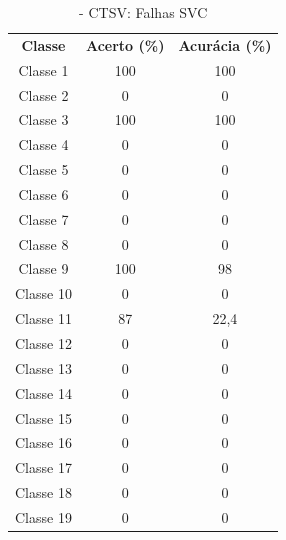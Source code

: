 \begin{itemize}
 \begin{table}[ht]
\centering
\begin{tabular}{ccc}
\textbf{Classe} & \textbf{Acerto (\%)} & \textbf{Acurácia (\%)} \\
Classe 1        & 100                  & 100                    \\
Classe 2        & 0                  & 0                    \\
Classe 3        & 100                  & 100                    \\
Classe 4        & 0                  & 0                    \\
Classe 5        & 0                  & 0                    \\
Classe 6        & 0                  & 0                    \\
Classe 7        & 0                  & 0                    \\
Classe 8        & 0                  & 0                    \\
Classe 9        & 100                  & 98                    \\
Classe 10       & 0                  & 0                    \\
Classe 11       & 87                  & 22,4 
\\
Classe 12       & 0                 & 0   
     \\
Classe 13      & 0                 & 0    
     \\
Classe 14       & 0                 & 0   
     \\
Classe 15       & 0                 & 0    
     \\
Classe 16       & 0                 & 0   
     \\
Classe 17       & 0                 & 0   
     \\
Classe 18     & 0                 & 0    
     \\
Classe 19       & 0                 & 0   
\end{tabular}
\caption{\label{tab:ctsvnsvm}- CTSV: Falhas SVC}
\end{table}


\end{itemize}
